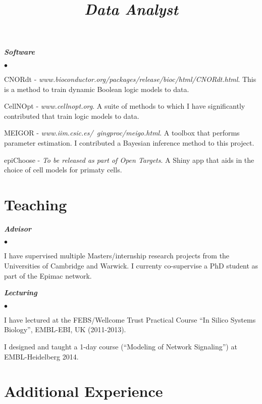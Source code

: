 \documentclass[overlapped, line, 11pt, letterpaper]{res}
\renewenvironment{itemize}{
\begin{list}{$\bullet$}
{\setlength{\itemsep}{0cm}}
}{\end{list}}
\begin{document}
\begin{resume}
\textbf{\emph{Software}}
\begin{itemize}
\item CNORdt - \emph{www.bioconductor.org/packages/release/bioc/html/CNORdt.html}. This is a method to train dynamic Boolean logic models to data.
\item CellNOpt - \emph{www.cellnopt.org}. A suite of methods to which I have significantly contributed that train logic models to data.
\item MEIGOR - \emph{www.iim.csic.es/~gingproc/meigo.html}. A toolbox that performs parameter estimation. I contributed a Bayesian inference method to this project.
\item epiChoose - \emph{To be released as part of Open Targets}. A Shiny app that aids in the choice of cell models for primaty cells.
\end{itemize}

\section{\bf Teaching}
\textbf{\emph{Advisor}}
\begin{itemize}
\item I have supervised multiple Masters/internship research projects from the Universities of Cambridge and Warwick. I currenty co-supervise a PhD student as part of the Epimac network.
\end{itemize}
\textbf{\emph{Lecturing}}
\begin{itemize}
\item I have lectured at the FEBS/Wellcome Trust Practical Course ``In Silico Systems Biology'', EMBL-EBI, UK (2011-2013).
\item I designed and taught a 1-day course (``Modeling of Network Signaling'') at EMBL-Heidelberg 2014.
\end{itemize}

\section{\bf Additional Experience}

\title{\it Data Analyst} 



\end{resume}
\end{document}
